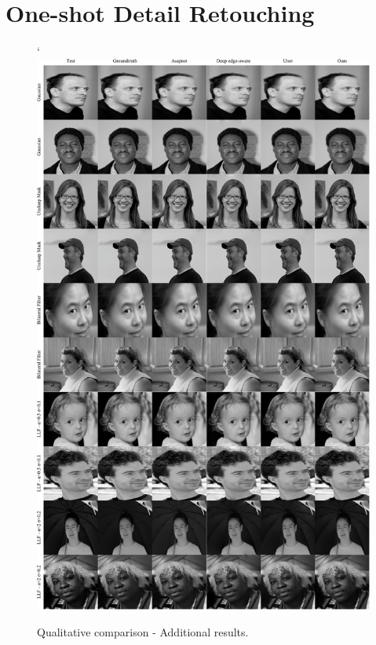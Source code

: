 \chapter{One-shot Detail Retouching}
\label{one-shot-add}


\begin{figure}[ht]
  \centering
  {`\includegraphics[width=0.9\linewidth]{Chapters/appendix-figs/face.pdf}}

   \caption{Qualitative comparison - Additional results.}
   \label{fig:appendix-tat1}
\end{figure}

